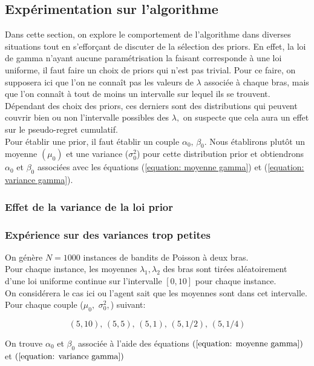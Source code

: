\documentclass[letterpaper,11pt]{article}
\begin{document}
\subsection{Expérimentation sur l'algorithme}

Dans cette section, on explore le comportement de l'algorithme dans diverses situations tout en s'efforçant de discuter de la sélection des priors. En effet, la loi de gamma n'ayant aucune paramétrisation la faisant corresponde à une loi uniforme, il faut faire un choix de priors qui n'est pas trivial. Pour ce faire, on supposera ici que l'on ne connaît pas les valeurs de $\lambda$ associée à chaque bras, mais que l'on connaît à tout de moins un intervalle sur lequel ils se trouvent. Dépendant des choix des priors, ces derniers sont des distributions qui peuvent couvrir bien ou non l'intervalle possibles des $\lambda,$ on suspecte que cela aura un effet sur le pseudo-regret cumulatif.\\

Pour établir une prior, il faut établir un couple $\alpha_0,\,\beta_0.$ Nous établirons plutôt un moyenne $(\mu_0)$ et une variance ($\sigma_0^2$) pour cette distribution prior et obtiendrons $\alpha_0$ et $\beta_0$ associées avec les équations (\ref{equation: moyenne gamma}) et (\ref{equation: variance gamma}).

\subsubsection{Effet de la variance de la loi prior}

\subsubsection*{Expérience sur des variances trop petites}

On génère $N=1000$ instances de bandits de Poisson à deux bras.\\
Pour chaque instance, les moyennes $\lambda_1, \lambda_2$ des bras sont tirées aléatoirement d'une loi uniforme continue sur l'intervalle $[0,10]$ pour chaque instance.\\
On considérera le cas ici ou l'agent sait que les moyennes sont dans cet intervalle.\\

Pour chaque couple ($\mu_0,$ $\sigma^2_0,$) suivant:

$$(5,10),\,(5,5),\,(5,1),\,(5,1/2),\,(5,1/4)$$

On trouve $\alpha_0$ et $\beta_0$ associée à l'aide des équations $(\ref{equation: moyenne gamma})$ et $(\ref{equation: variance gamma})$
\\
\end{document}
